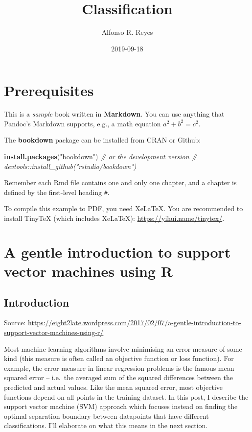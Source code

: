 \documentclass[]{book}
\title{Classification}
\author{Alfonso R. Reyes}
\date{2019-09-18}
\newenvironment{Shaded}{\begin{snugshade}}{\end{snugshade}}
\newcommand{\CommentTok}[1]{\textcolor[rgb]{0.56,0.35,0.01}{\textit{#1}}}
\newcommand{\KeywordTok}[1]{\textcolor[rgb]{0.13,0.29,0.53}{\textbf{#1}}}
\newcommand{\NormalTok}[1]{#1}
\newcommand{\StringTok}[1]{\textcolor[rgb]{0.31,0.60,0.02}{#1}}
\begin{document}
\maketitle

{
\setcounter{tocdepth}{1}
\tableofcontents
}
\hypertarget{prerequisites}{%
\chapter*{Prerequisites}\label{prerequisites}}

This is a \emph{sample} book written in \textbf{Markdown}. You can use anything that Pandoc's Markdown supports, e.g., a math equation \(a^2 + b^2 = c^2\).

The \textbf{bookdown} package can be installed from CRAN or Github:

\begin{Shaded}
\begin{Highlighting}[]
\KeywordTok{install.packages}\NormalTok{(}\StringTok{"bookdown"}\NormalTok{)}
\CommentTok{# or the development version}
\CommentTok{# devtools::install_github("rstudio/bookdown")}
\end{Highlighting}
\end{Shaded}

Remember each Rmd file contains one and only one chapter, and a chapter is defined by the first-level heading \texttt{\#}.

To compile this example to PDF, you need XeLaTeX. You are recommended to install TinyTeX (which includes XeLaTeX): \url{https://yihui.name/tinytex/}.

\hypertarget{a-gentle-introduction-to-support-vector-machines-using-r}{%
\chapter{A gentle introduction to support vector machines using R}\label{a-gentle-introduction-to-support-vector-machines-using-r}}

\hypertarget{introduction}{%
\section{Introduction}\label{introduction}}

Source: \url{https://eight2late.wordpress.com/2017/02/07/a-gentle-introduction-to-support-vector-machines-using-r/}

Most machine learning algorithms involve minimising an error measure of some kind (this measure is often called an objective function or loss function). For example, the error measure in linear regression problems is the famous mean squared error -- i.e.~the averaged sum of the squared differences between the predicted and actual values. Like the mean squared error, most objective functions depend on all points in the training dataset. In this post, I describe the support vector machine (SVM) approach which focuses instead on finding the optimal separation boundary between datapoints that have different classifications. I'll elaborate on what this means in the next section.
\end{document}
